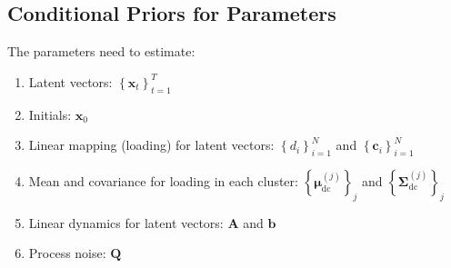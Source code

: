 \documentclass[]{article}
\begin{document}
\subsection{Conditional Priors for Parameters}
The parameters need to estimate:
\begin{enumerate}
	\def\labelenumi{(\arabic{enumi})}
	\item
	Latent vectors: \(\left\{ \mathbf{x}_{t} \right\}_{t=1}^T\)
	\item
	Initials: \(\mathbf{x}_{0}\)
	\item
	Linear mapping (loading) for latent vectors:
	\(\left\{ d_{i} \right\}_{i = 1}^{N}\) and
	\(\left\{ \mathbf{c}_{i} \right\}_{i = 1}^{N}\)
	\item
	Mean and covariance for loading in each cluster:
	\(\left\{ \bm{\mu}_{\text{dc}}^{(j)} \right\}_{j}\) and
	\(\left\{ \mathbf{\Sigma}_{\text{dc}}^{(j)} \right\}_{j}\)
	\item
	Linear dynamics for latent vectors: \(\mathbf{A}\) and \(\mathbf{b}\)
	\item
	Process noise: \(\mathbf{Q}\)
\end{enumerate}
\end{document}
